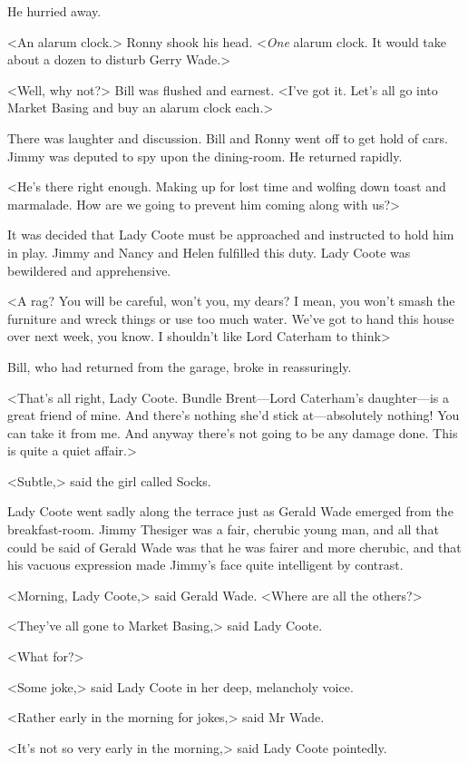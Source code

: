 He hurried away.

<An alarum clock.> Ronny shook his head. <\emph{One} alarum clock. It would take about a dozen to disturb Gerry Wade.>

<Well, why not?> Bill was flushed and earnest. <I've got it. Let's all go into Market Basing and buy an alarum clock each.>

There was laughter and discussion. Bill and Ronny went off to get hold of cars. Jimmy was deputed to spy upon the dining-room. He returned rapidly.

<He's there right enough. Making up for lost time and wolfing down toast and marmalade. How are we going to prevent him coming along with us?>

It was decided that Lady Coote must be approached and instructed to hold him in play. Jimmy and Nancy and Helen fulfilled this duty. Lady Coote was bewildered and apprehensive.

<A rag? You will be careful, won't you, my dears? I mean, you won't smash the furniture and wreck things or use too much water. We've got to hand this house over next week, you know. I shouldn't like Lord Caterham to think\longdash>

Bill, who had returned from the garage, broke in reassuringly.

<That's all right, Lady Coote. Bundle Brent—Lord Caterham's daughter—is a great friend of mine. And there's nothing she'd stick at—absolutely nothing! You can take it from me. And anyway there's not going to be any damage done. This is quite a quiet affair.>

<Subtle,> said the girl called Socks.

Lady Coote went sadly along the terrace just as Gerald Wade emerged from the breakfast-room. Jimmy Thesiger was a fair, cherubic young man, and all that could be said of Gerald Wade was that he was fairer and more cherubic, and that his vacuous expression made Jimmy's face quite intelligent by contrast.

<Morning, Lady Coote,> said Gerald Wade. <Where are all the others?>

<They've all gone to Market Basing,> said Lady Coote.

<What for?>

<Some joke,> said Lady Coote in her deep, melancholy voice.

<Rather early in the morning for jokes,> said Mr Wade.

<It's not so very early in the morning,> said Lady Coote pointedly.

